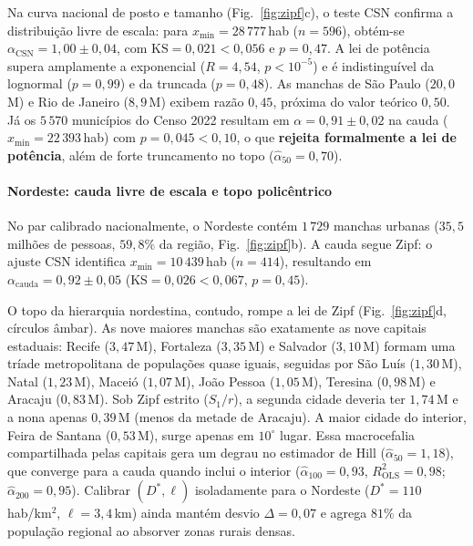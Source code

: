 \documentclass[10pt,a4paper,twocolumn]{article}
\begin{document}
Na curva nacional de posto e tamanho (Fig.~\ref{fig:zipf}c), o teste CSN confirma a distribuição livre de escala: para $x_{\min} = 28\,777$\,hab ($n=596$), obtém-se $\alpha_{\mathrm{CSN}} = 1{,}00 \pm 0{,}04$, com $\mathrm{KS} = 0{,}021 < 0{,}056$ e $p = 0{,}47$. A lei de potência supera amplamente a exponencial ($R = 4{,}54$, $p < 10^{-5}$) e é indistinguível da lognormal ($p = 0{,}99$) e da truncada ($p = 0{,}48$). As manchas de São Paulo ($20{,}0$\,M) e Rio de Janeiro ($8{,}9$\,M) exibem razão $0{,}45$, próxima do valor teórico $0{,}50$. Já os $5\,570$ municípios do Censo 2022 resultam em $\alpha = 0{,}91 \pm 0{,}02$ na cauda ($x_{\min}=22\,393$\,hab) com $p = 0{,}045 < 0{,}10$, o que \textbf{rejeita formalmente a lei de potência}, além de forte truncamento no topo ($\hat{\alpha}_{50} = 0{,}70$).

\paragraph{Nordeste: cauda livre de escala e topo policêntrico}
No par calibrado nacionalmente, o Nordeste contém $1\,729$ manchas urbanas ($35{,}5$ milhões de pessoas, $59{,}8\%$ da região, Fig.~\ref{fig:zipf}b). A cauda segue Zipf: o ajuste CSN identifica $x_{\min} = 10\,439$\,hab ($n=414$), resultando em $\alpha_{\mathrm{cauda}} = 0{,}92 \pm 0{,}05$ ($\mathrm{KS} = 0{,}026 < 0{,}067$, $p = 0{,}45$).

O topo da hierarquia nordestina, contudo, rompe a lei de Zipf (Fig.~\ref{fig:zipf}d, círculos âmbar). As nove maiores manchas são exatamente as nove capitais estaduais: Recife ($3{,}47$\,M), Fortaleza ($3{,}35$\,M) e Salvador ($3{,}10$\,M) formam uma tríade metropolitana de populações quase iguais, seguidas por São Luís ($1{,}30$\,M), Natal ($1{,}23$\,M), Maceió ($1{,}07$\,M), João Pessoa ($1{,}05$\,M), Teresina ($0{,}98$\,M) e Aracaju ($0{,}83$\,M). Sob Zipf estrito ($S_1/r$), a segunda cidade deveria ter $1{,}74$\,M e a nona apenas $0{,}39$\,M (menos da metade de Aracaju). A maior cidade do interior, Feira de Santana ($0{,}53$\,M), surge apenas em $10^{\circ}$ lugar. Essa macrocefalia compartilhada pelas capitais gera um degrau no estimador de Hill ($\hat{\alpha}_{50} = 1{,}18$), que converge para a cauda quando inclui o interior ($\hat{\alpha}_{100} = 0{,}93$, $R^{2}_{\mathrm{OLS}} = 0{,}98$; $\hat{\alpha}_{200} = 0{,}95$). Calibrar $(D^{*},\ell)$ isoladamente para o Nordeste ($D^{*} = 110$\,hab/km$^{2}$, $\ell = 3{,}4$\,km) ainda mantém desvio $\Delta = 0{,}07$ e agrega $81\%$ da população regional ao absorver zonas rurais densas.
\end{document}
